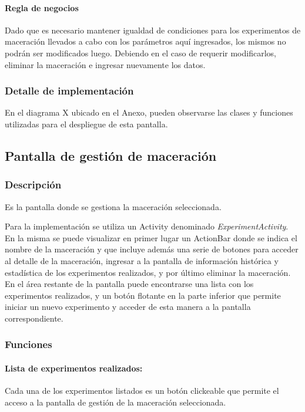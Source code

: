                 \paragraph{Regla de negocios}
                Dado que es necesario mantener igualdad de condiciones para los experimentos de maceración llevados a cabo con los parámetros aquí ingresados, los mismos no podrán ser modificados luego. Debiendo en el caso de requerir modificarlos, eliminar la maceración e ingresar nuevamente los datos.
            
            \subsubsection{Detalle de implementación}
                En el diagrama X ubicado en el Anexo, pueden observarse las clases y funciones utilizadas para el despliegue de esta pantalla.
        
        \subsection{Pantalla de gestión de maceración}
            \subsubsection{Descripción}
                \par Es la pantalla donde se gestiona la maceración seleccionada.
                \par Para la implementación se utiliza un Activity denominado \textit{ExperimentActivity}. En la misma se puede visualizar en primer lugar un ActionBar donde se indica el nombre de la maceración y que incluye además una serie de botones para acceder al detalle de la maceración, ingresar a la pantalla de información histórica y estadística de los experimentos realizados, y por último eliminar la maceración. En el área restante de la pantalla puede encontrarse una lista con los experimentos realizados, y un botón flotante en la parte inferior que permite iniciar un nuevo experimento y acceder de esta manera a la pantalla correspondiente.
                
                
            \subsubsection{Funciones}
                \paragraph{Lista de experimentos realizados:}
                Cada una de los experimentos listados es un botón clickeable que permite el acceso a la pantalla de gestión de la maceración seleccionada.
